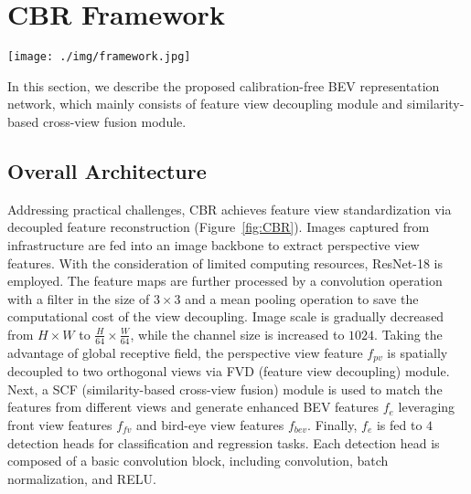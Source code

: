 \documentclass[letterpaper, 10 pt, conference]{ieeeconf}
\begin{document}
\section{CBR Framework}

\begin{figure*}
  \centering
  \texttt{[image: ./img/framework.jpg]}
  \caption{Framework of the Calibration-free BEV Representation (CBR) network.}
  \label{fig:CBR}
\end{figure*}

\label{sec:method}
In this section, we describe the proposed calibration-free BEV representation network, which mainly consists of  feature view decoupling module and  similarity-based cross-view fusion module.

\subsection{Overall Architecture}
Addressing practical challenges, CBR achieves feature view standardization via decoupled feature reconstruction (Figure~\ref{fig:CBR}). Images captured from infrastructure are fed into an image backbone to extract perspective view features. With the consideration of limited computing resources, ResNet-18 is employed. The feature maps are further processed by a convolution operation with a filter in the size of $3 \times 3$ and a mean pooling operation to save the computational cost of the view decoupling. Image scale is gradually decreased from $H \times W$ to $\frac{H}{64} \times \frac{W}{64}$, while the channel size is increased to $1024$. Taking the advantage of global receptive field, the perspective view feature $f_{pv}$ is spatially decoupled to two orthogonal views via FVD (feature view decoupling) module. Next, a SCF (similarity-based cross-view fusion) module is used to match the features from different views and generate enhanced BEV features $f_e$ leveraging front view features $f_{fv}$ and bird-eye view features $f_{bev}$. Finally, $f_e$ is fed to $4$ detection heads for classification and regression tasks. Each detection head is composed of a 
basic convolution block, including convolution, batch normalization, and RELU.
\end{document}
